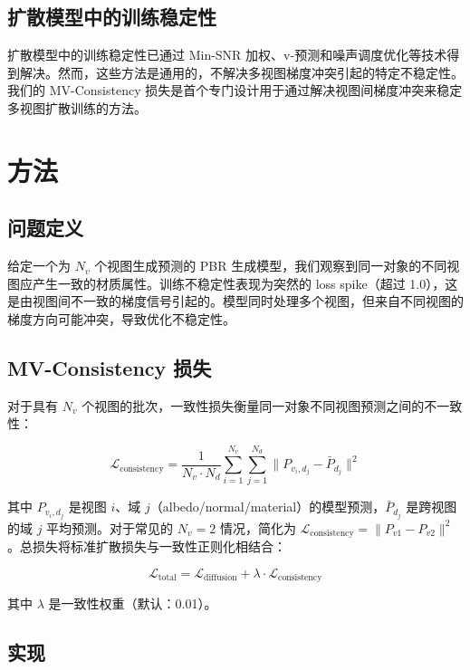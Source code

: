 \documentclass{article}
\begin{document}
\subsection{扩散模型中的训练稳定性}

扩散模型中的训练稳定性已通过 Min-SNR 加权、v-预测和噪声调度优化等技术得到解决。然而，这些方法是通用的，不解决多视图梯度冲突引起的特定不稳定性。我们的 MV-Consistency 损失是首个专门设计用于通过解决视图间梯度冲突来稳定多视图扩散训练的方法。

\section{方法}

\subsection{问题定义}

给定一个为 $N_v$ 个视图生成预测的 PBR 生成模型，我们观察到同一对象的不同视图应产生一致的材质属性。训练不稳定性表现为突然的 loss spike（超过 1.0），这是由视图间不一致的梯度信号引起的。模型同时处理多个视图，但来自不同视图的梯度方向可能冲突，导致优化不稳定性。

\subsection{MV-Consistency 损失}

对于具有 $N_v$ 个视图的批次，一致性损失衡量同一对象不同视图预测之间的不一致性：

\begin{equation}
\mathcal{L}_{\text{consistency}} = \frac{1}{N_v \cdot N_d} \sum_{i=1}^{N_v} \sum_{j=1}^{N_d} \|P_{v_i,d_j} - \bar{P}_{d_j}\|^2
\end{equation}

其中 $P_{v_i,d_j}$ 是视图 $i$、域 $j$（albedo/normal/material）的模型预测，$\bar{P}_{d_j}$ 是跨视图的域 $j$ 平均预测。对于常见的 $N_v=2$ 情况，简化为 $\mathcal{L}_{\text{consistency}} = \|P_{v1} - P_{v2}\|^2$。总损失将标准扩散损失与一致性正则化相结合：

\begin{equation}
\mathcal{L}_{\text{total}} = \mathcal{L}_{\text{diffusion}} + \lambda \cdot \mathcal{L}_{\text{consistency}}
\end{equation}

其中 $\lambda$ 是一致性权重（默认：0.01）。

\subsection{实现}
\end{document}
